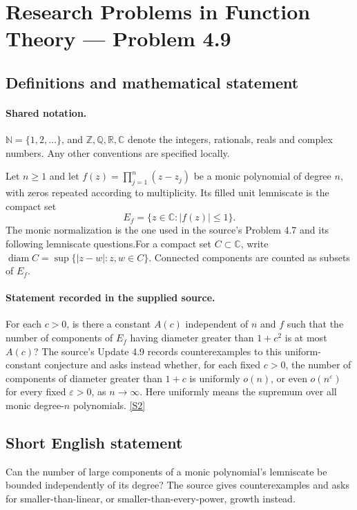 \documentclass[11pt]{book}
\newcommand{\sref}[2]{\hyperlink{source:#1:#2}{[S#2]}}
\begin{document}
\section{Research Problems in Function Theory — Problem 4.9}\label{statement}

\subsection{Definitions and mathematical statement}

\paragraph{Shared notation.}$\mathbb N=\{1,2,\ldots\}$, and $\mathbb Z,\mathbb Q,\mathbb R,\mathbb C$ denote the integers, rationals, reals and complex numbers. Any other conventions are specified locally.


Let $n\ge1$ and let $f(z)=\prod_{j=1}^n(z-z_j)$ be a monic polynomial of degree $n$, with zeros repeated according to multiplicity. Its filled unit lemniscate is the compact set
\[E_f=\{z\in\mathbb C:|f(z)|\le1\}.
\]
The monic normalization is the one used in the source's Problem 4.7 and its following lemniscate questions.For a compact set $C\subset\mathbb C$, write $\operatorname{diam}C=\sup\{|z-w|:z,w\in C\}$. Connected components are counted as subsets of $E_f$.
\paragraph{Statement recorded in the supplied source.}
For each $c>0$, is there a constant $A(c)$ independent of $n$ and $f$ such that the number of components of $E_f$ having diameter greater than $1+c^2$ is at most $A(c)$? The source's Update 4.9 records counterexamples to this uniform-constant conjecture and asks instead whether, for each fixed $c>0$, the number of components of diameter greater than $1+c$ is uniformly $o(n)$, or even $o(n^\varepsilon)$ for every fixed $\varepsilon>0$, as $n\to\infty$. Here uniformly means the supremum over all monic degree-$n$ polynomials. \sref{statement}{2}
\subsection{Short English statement}
Can the number of large components of a monic polynomial’s lemniscate be bounded independently of its degree? The source gives counterexamples and asks for smaller-than-linear, or smaller-than-every-power, growth instead.
\end{document}
